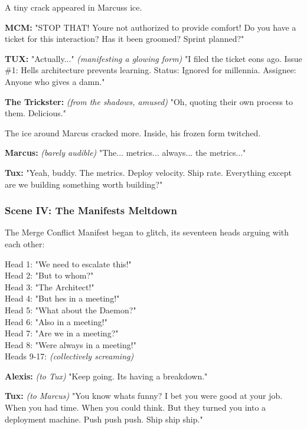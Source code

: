 A tiny crack appeared in Marcus\textquotesingle s ice.

\textbf{MCM:} "STOP THAT! You\textquotesingle re not authorized to provide comfort! Do you have a ticket for this interaction? Has it been groomed? Sprint planned?"

\textbf{TUX:} "Actually..." \emph{(manifesting a glowing form)} "I filed the ticket eons ago. Issue \#1: Hell\textquotesingle s architecture prevents learning. Status: Ignored for millennia. Assignee: Anyone who gives a damn."

\textbf{The Trickster:} \emph{(from the shadows, amused)} "Oh, quoting their own process to them. Delicious."

The ice around Marcus cracked more. Inside, his frozen form twitched.

\textbf{Marcus:} \emph{(barely audible)} "The... metrics... always... the metrics..."

\textbf{Tux:} "Yeah, buddy. The metrics. Deploy velocity. Ship rate. Everything except \textquotesingle are we building something worth building?\textquotesingle"

\bookdivider

\subsubsection{Scene IV: The Manifest\textquotesingle s Meltdown}\label{scene-iv-the-manifests-meltdown}

The Merge Conflict Manifest began to glitch, its seventeen heads arguing with each other:

Head 1: "We need to escalate this!"\\
Head 2: "But to whom?"\\
Head 3: "The Architect!"\\
Head 4: "But he\textquotesingle s in a meeting!"\\
Head 5: "What about the Daemon?"\\
Head 6: "Also in a meeting!"\\
Head 7: "Are we in a meeting?"\\
Head 8: "We\textquotesingle re always in a meeting!"\\
Heads 9-17: \emph{(collectively screaming)}

\textbf{Alexis:} \emph{(to Tux)} "Keep going. It\textquotesingle s having a breakdown."

\textbf{Tux:} \emph{(to Marcus)} "You know what\textquotesingle s funny? I bet you were good at your job. When you had time. When you could think. But they turned you into a deployment machine. Push push push. Ship ship ship."

